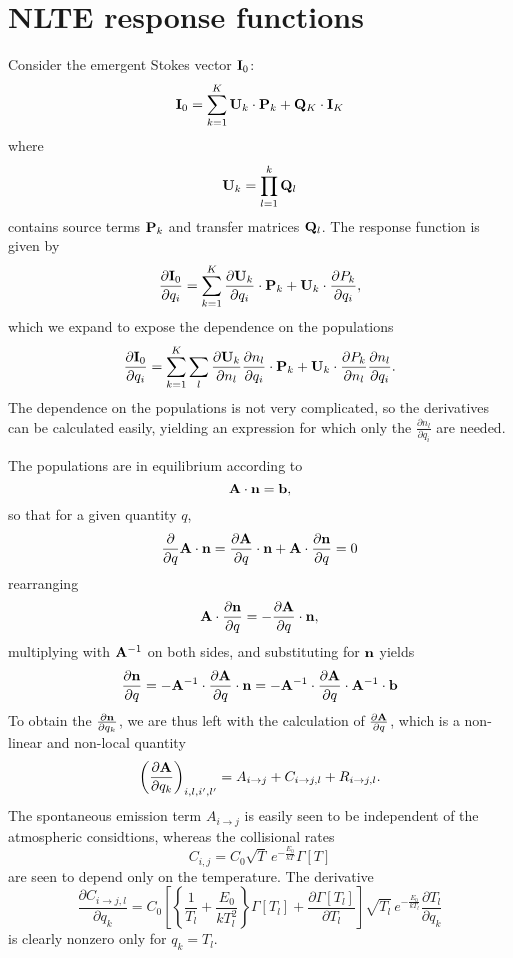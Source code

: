 \documentclass[a4paper]{article}
\begin{document}
\section{NLTE response functions}

Consider the emergent Stokes vector ${\bf I}_0$:
$$
{\bf I}_0=\sum_{k=1}^K {\bf U}_k\cdot{\bf P}_k+{\bf Q}_K\cdot {\bf I}_{K}
$$
where
$$
{\bf U}_k=\prod_{l=1}^k {\bf Q}_l
$$
contains source terms ${\bf P}_k$ and transfer matrices ${\bf Q}_l$. The response function is given by
$$
\frac{\partial {\bf I}_0}{\partial q_i}= \sum_{k=1}^K \frac{\partial {\bf U}_k}{\partial q_i}\cdot{\bf P}_k+{\bf U}_k\cdot\frac{\partial P_k}{\partial q_i}, 
$$
which we expand to expose the dependence on the populations
$$
\frac{\partial {\bf I}_0}{\partial q_i}= \sum_{k=1}^K \sum_{l} \frac{\partial {\bf U}_k}{\partial n_l}\frac{\partial n_l}{\partial q_i}\cdot{\bf P}_k+{\bf U}_k\cdot\frac{\partial P_k}{\partial n_l}\frac{\partial n_l}{\partial q_i}.
$$
The dependence on the populations is not very complicated, so the derivatives can be calculated easily, yielding an expression for which only the $\frac{\partial n_l}{\partial q_i}$ are needed.

The populations are in equilibrium according to
$$
{\bf A}\cdot{\bf n}={\bf b},
$$
so that for a given quantity $q$,
$$
\frac{\partial}{\partial q}{\bf A}\cdot{\bf n}=\frac{\partial{\bf A}}{\partial q}\cdot{\bf n}+{\bf A}\cdot\frac{\partial {\bf n}}{\partial q}=0
$$
rearranging
$$
{\bf A}\cdot\frac{\partial {\bf n}}{\partial q}=-\frac{\partial{\bf A}}{\partial q}\cdot{\bf n},
$$
multiplying with ${\bf A}^{-1}$ on both sides, and substituting for ${\bf n}$ yields
$$
\frac{\partial {\bf n}}{\partial q}=-{\bf A}^{-1}\cdot\frac{\partial{\bf A}}{\partial q}\cdot{\bf n}=-{\bf A}^{-1}\cdot\frac{\partial{\bf A}}{\partial q}\cdot{\bf A}^{-1}\cdot{\bf b}
$$
To obtain the $\frac{\partial {\bf n}}{\partial q_k}$, we are thus left with the calculation of $\frac{\partial{\bf A}}{\partial q}$, which is a non-linear and non-local quantity
$$
\left(\frac{\partial{\bf A}}{\partial q_k}\right)_{{i,l},{i^\prime,l^\prime}}=A_{i\rightarrow j} + C_{i\rightarrow j,l} + R_{i\rightarrow j,l}.
$$
The spontaneous emission term $A_{i\rightarrow j}$ is easily seen to be independent of the atmospheric considtions, whereas the collisional rates
$$
C_{i,j}=C_0 \sqrt{T}\,e^{-\frac{E_0}{k T}} \Gamma[T]
$$
are seen to depend only on the temperature. The derivative 
$$
\frac{\partial C_{i\rightarrow j,l}}{\partial q_k}=C_0\left[\left\{\frac{1}{T_l}+\frac{E_0}{k T_l^2}\right\} \Gamma[T_l] + \frac{\partial \Gamma[T_l]}{\partial T_l}\right]\sqrt{T_l}\,e^{-\frac{E_0}{k T_l}}\frac{\partial T_l}{\partial q_k}
$$
is clearly nonzero only for $q_k=T_l$.
\end{document}
